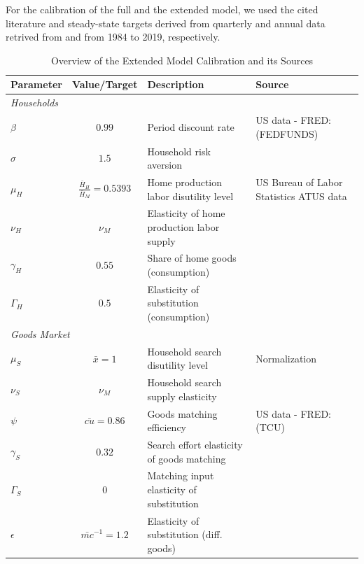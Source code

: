 \documentclass[12pt,3p,authoryear,review]{elsarticle}
\begin{document}
\begin{small}%
For the calibration of the full and the extended model, we used the cited literature and steady-state targets derived from quarterly and annual data retrived from \cite{fredDATA} and \cite{atusDATA} from 1984 to 2019, respectively.%
\begin{table}[h!]%
	\begin{center}%
	\begin{scriptsize}%
	\caption{Overview of the Extended Model Calibration and its Sources}\label{tab:calibration_sources}%
	\begin{tabular}{l c l l}%
		\hline%
		Parameter & Value/Target & Description & Source\\%
		\hline \hline%
		\multicolumn{4}{l}{\textit{Households}}\\%
		$\beta$ & $0.99$ & Period discount rate & US data - FRED: (FEDFUNDS)\\%
		$\sigma$ & $1.5$ & Household risk aversion & \cite{smetsShocksFrictionsUS2007}\\%
		$\mu_H$ & $\frac{\bar{H}_H}{\bar{H}_M} = 0.5393$ & Home production labor disutility level & US Bureau of Labor Statistics ATUS data \\%
		$\nu_H$ & $\nu_M$ & Elasticity of home production labor supply & \cite{gnocchiHouseworkFiscalExpansions2016}\\%
		$\gamma_H$ & $0.55$ & Share of home goods (consumption) & \cite{gnocchiHouseworkFiscalExpansions2016}\\%
		$\Gamma_H$ & $0.5$ & Elasticity of substitution (consumption) & \cite{gnocchiHouseworkFiscalExpansions2016}\\%
		\hline%
		\multicolumn{4}{l}{\textit{Goods Market}}\\%
		$\mu_S$ & $\bar{x} = 1$ & Household search disutility level & Normalization\\%
		$\nu_S$ & $\nu_M$ & Household search supply elasticity & \cite{huoDemandInducedFluctuations2020}\\%
		$\psi$ & $\bar{cu}=0.86$ & Goods matching efficiency & US data - FRED: (TCU)\\%
		$\gamma_S$ & $0.32$ & Search effort elasticity of goods matching & \cite{qiuProcyclicalProductivityNew2022}\\%
		$\Gamma_S$ & $0$ & Matching input elasticity of substitution & \cite{qiuProcyclicalProductivityNew2022}\\%
		$\epsilon$ & $\bar{mc}^{-1} = 1.2$ & Elasticity of substitution (diff. goods) & \cite{christianoDSGEModelsMonetary2010}\\%

\end{tabular}
\end{scriptsize}
\end{center}
\end{table}
\end{small}
\end{document}
